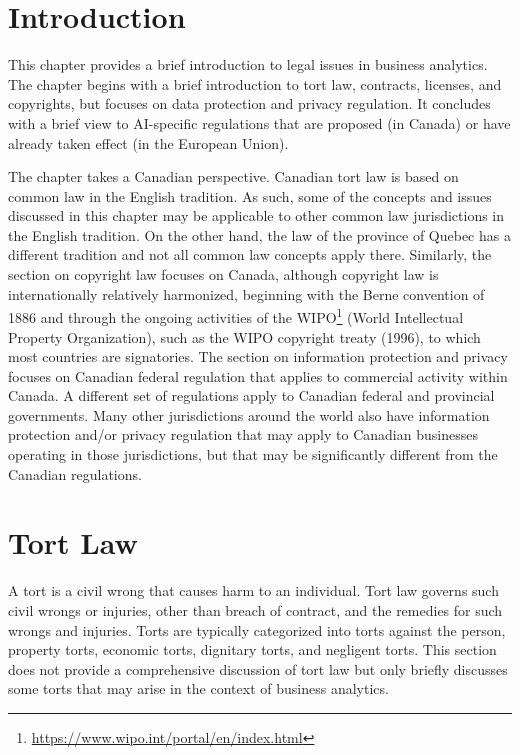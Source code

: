 %
%

\section{Introduction}

This chapter provides a brief introduction to legal issues in business analytics. The chapter begins with a brief introduction to tort law, contracts, licenses, and copyrights, but focuses on data protection and privacy regulation. It concludes with a brief view to AI-specific regulations that are proposed (in Canada) or have already taken effect (in the European Union). 

The chapter takes a Canadian perspective. Canadian tort law is based on common law in the English tradition. As such, some of the concepts and issues discussed in this chapter may be applicable to other common law jurisdictions in the English tradition. On the other hand, the law of the province of Quebec has a different tradition and not all common law concepts apply there. Similarly, the section on copyright law focuses on Canada, although copyright law is internationally relatively harmonized, beginning with the Berne convention of 1886 and through the ongoing activities of the WIPO\footnote{\url{https://www.wipo.int/portal/en/index.html}}  (World Intellectual Property Organization), such as the WIPO copyright treaty (1996), to which most countries are signatories. The section on information protection and privacy focuses on Canadian federal regulation that applies to commercial activity within Canada. A different set of regulations apply to Canadian federal and provincial governments. Many other jurisdictions around the world also have information protection and/or privacy regulation that may apply to Canadian businesses operating in those jurisdictions, but that may be significantly different from the Canadian regulations. 

\section{Tort Law}

A tort  is a civil wrong that causes harm to an individual. Tort law governs such civil wrongs or injuries, other than breach of contract, and the remedies for such wrongs and injuries. Torts are typically categorized into torts against the person, property torts, economic torts, dignitary torts, and negligent torts. This section does not provide a comprehensive discussion of tort law but only briefly discusses some torts that may arise in the context of business analytics. 

